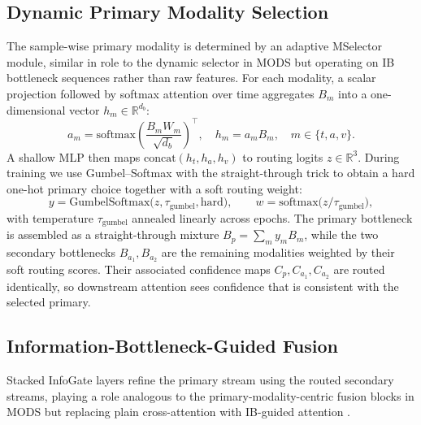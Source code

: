 \subsection{Dynamic Primary Modality Selection}
\label{sec:method-msel}
The sample-wise primary modality is determined by an adaptive MSelector
module, similar in role to the dynamic selector in MODS
\citep{mods2026align} but operating on IB bottleneck sequences rather than raw
features.
For each modality, a scalar projection followed by softmax attention over
time aggregates $B_m$ into a one-dimensional vector
$h_m \in \mathbb{R}^{d_b}$:
\begin{equation}
  a_m = \mathrm{softmax}\!\left(\frac{B_m W_m}{\sqrt{d_b}}\right)^{\!\top},
  \quad
  h_m = a_m B_m,
  \quad m \in \{t, a, v\}.
\end{equation}
A shallow MLP then maps $\mathrm{concat}(h_t, h_a, h_v)$ to routing logits
$z \in \mathbb{R}^3$. During training we use Gumbel--Softmax with the
straight-through trick \citep{jang2017gumbel} to obtain a hard one-hot primary
choice together with a soft routing weight:
\begin{equation}
  y = \mathrm{GumbelSoftmax}\!\bigl(z,\tau_{\mathrm{gumbel}},\mathrm{hard}\bigr),
  \qquad
  w = \mathrm{softmax}\!\bigl(z / \tau_{\mathrm{gumbel}}\bigr),
\end{equation}
with temperature $\tau_{\mathrm{gumbel}}$ annealed linearly across epochs.
The primary bottleneck is assembled as a straight-through mixture
$B_p = \sum_m y_m B_m$, while the two secondary bottlenecks
$B_{a_1}, B_{a_2}$ are the remaining modalities weighted by their soft routing
scores. Their associated confidence maps $C_p, C_{a_1}, C_{a_2}$ are routed
identically, so downstream attention sees confidence that is consistent with
the selected primary.

\subsection{Information-Bottleneck-Guided Fusion}
\label{sec:method-layer}
Stacked InfoGate layers refine the primary stream using the routed secondary
streams, playing a role analogous to the primary-modality-centric fusion
blocks in MODS but replacing plain cross-attention with IB-guided attention
\citep{alemi2017deep}.

